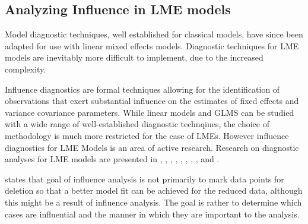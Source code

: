 \documentclass[12pt, a4paper]{report}
\theoremstyle{plain}
\theoremstyle{definition}
\theoremstyle{remark}
\begin{document}
\subsection{Analyzing Influence in LME models}

Model diagnostic techniques, well established for classical models, have since been adapted for use with linear mixed effects models. Diagnostic techniques for LME models are inevitably more difficult to implement, due to the increased complexity.

Influence diagnostics are formal techniques allowing for the identification of observations that exert substantial  influence on the estimates of fixed effects and variance covariance parameters.
While linear models and GLMS can be studied with a wide range of well-established diagnostic technqiues, the choice of methodology is much more restricted for the case of LMEs. However
	influence diagnostics for LME Models is an area of active research. Research on diagnostic analyses for LME models are presented in \citet{Beckman}, 
	\citet{Christensen}, \citet{HildenMinton}, \citet{lesaffre1998local}, \citet{Banerjee1997}, 
	\citet{fung2002}, \citet{Demi}, \citet{Zewotir}, \citet{zewotir2008} and \citet{NobreSinger2007, NobreSinger2011}.
	
	
	
	
	
	\citet{schabenberger} states that goal of influence analysis is not primarily to mark data
	points for deletion so that a better model fit can be achieved for the reduced data, although this might be a
	result of influence analysis. The goal is rather to determine which cases are influential and the manner in
	which they are important to the analysis. 



%








%
\end{document}
